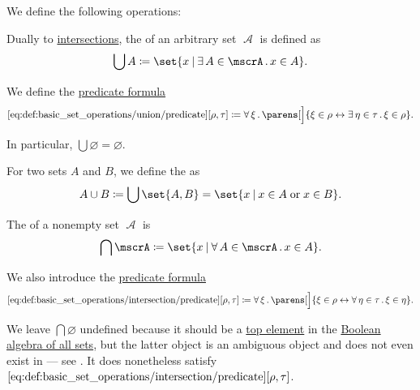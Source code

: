 \begin{definition}\label{def:basic_set_operations}
  We define the following operations:

  \begin{thmenum}
     Dually to \hyperref[def:basic_set_operations/intersection]{intersections}, the  of an arbitrary set \( \mscrA \) is defined as
    \begin{equation*}
      \bigcup A \coloneqq \set{ x \given \qexists {A \in \mscrA} x \in A }.
    \end{equation*}

    We define the \hyperref[rem:predicate_formula]{predicate formula}
    \begin{equation*}\taglabel[\op{IsUnion}]{eq:def:basic_set_operations/union/predicate}
      \ref{eq:def:basic_set_operations/union/predicate}[\rho, \tau] \coloneqq \qforall \xi \parens[\Big]{ \xi \in \rho \leftrightarrow \qexists {\eta \in \tau} \xi \in \rho }.
    \end{equation*}

    In particular, \( \bigcup \varnothing = \varnothing \).

    For two sets \( A \) and \( B \), we define the  as
    \begin{equation*}
      A \cup B \coloneqq \bigcup \set{ A, B } = \set{ x \given x \in A \T{or} x \in B }.
    \end{equation*}

     The  of a nonempty set \( \mscrA \) is
    \begin{equation*}
      \bigcap \mscrA \coloneqq \set{ x \given \qforall {A \in \mscrA} x \in A }.
    \end{equation*}

    We also introduce the \hyperref[rem:predicate_formula]{predicate formula}
    \begin{equation*}\taglabel[\op{IsIntersection}]{eq:def:basic_set_operations/intersection/predicate}
      \ref{eq:def:basic_set_operations/intersection/predicate}[\rho, \tau] \coloneqq \qforall \xi \parens[\Big]{ \xi \in \rho \leftrightarrow \qforall {\eta \in \tau} \xi \in \eta }.
    \end{equation*}

    We leave \( \bigcap \varnothing \) undefined because it should be a \hyperref[def:extremal_points/top_and_bottom]{top element} in the \hyperref[thm:boolean_algebra_of_subsets]{Boolean algebra of all sets}, but the latter object is an ambiguous object and does not even exist in  --- see . It does nonetheless satisfy \( \ref{eq:def:basic_set_operations/intersection/predicate}[\rho, \tau] \).


\end{thmenum}
\end{definition}
